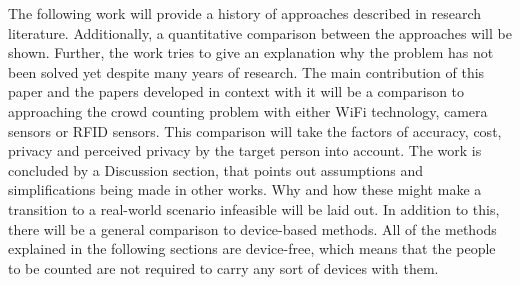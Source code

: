 \documentclass[conference]{IEEEtran}
\begin{document}
\par
The following work will provide a history of approaches described in research literature. Additionally, a quantitative comparison between the approaches will be shown. Further, the work tries to give an explanation why the problem has not been solved yet despite many years of research. The main contribution of this paper and the papers developed in context with it will be a comparison to approaching the crowd counting problem with either WiFi technology, camera sensors or RFID sensors. This comparison will take the factors of accuracy, cost, privacy and perceived privacy by the target person into account. The work is concluded by a Discussion section, that points out assumptions and simplifications being made in other works. Why and how these might make a transition to a real-world scenario infeasible will be laid out. In addition to this, there will be a general comparison to device-based methods. All of the methods explained in the following sections are device-free, which means that the people to be counted are not required to carry any sort of devices with them.
\end{document}
